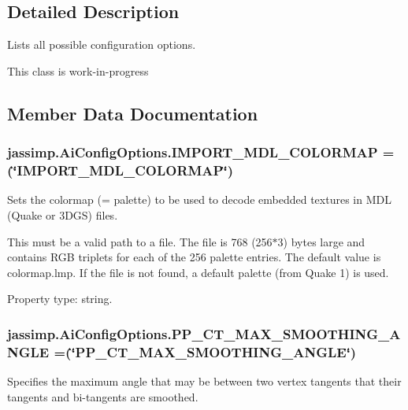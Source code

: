 \subsection{Detailed Description}
Lists all possible configuration options.

This class is work-\/in-\/progress 

\subsection{Member Data Documentation}
\hypertarget{enumjassimp_1_1_ai_config_options_a78ad0d97535fb52c830b6c853e9789c5}{
\subsubsection[{I\+M\+P\+O\+R\+T\+\_\+\+M\+D\+L\+\_\+\+C\+O\+L\+O\+R\+M\+A\+P}]{\setlength{\rightskip}{0pt plus 5cm}jassimp.\+Ai\+Config\+Options.\+I\+M\+P\+O\+R\+T\+\_\+\+M\+D\+L\+\_\+\+C\+O\+L\+O\+R\+M\+A\+P =(\char`\"{}I\+M\+P\+O\+R\+T\+\_\+\+M\+D\+L\+\_\+\+C\+O\+L\+O\+R\+M\+A\+P\char`\"{})}}\label{enumjassimp_1_1_ai_config_options_a78ad0d97535fb52c830b6c853e9789c5}
Sets the colormap (= palette) to be used to decode embedded textures in M\+D\+L (Quake or 3\+D\+G\+S) files.

This must be a valid path to a file. The file is 768 (256$\ast$3) bytes large and contains R\+G\+B triplets for each of the 256 palette entries. The default value is colormap.\+lmp. If the file is not found, a default palette (from Quake 1) is used.

Property type\+: string. \hypertarget{enumjassimp_1_1_ai_config_options_a91a508bfe571464e685c1b384386467a}{
\subsubsection[{P\+P\+\_\+\+C\+T\+\_\+\+M\+A\+X\+\_\+\+S\+M\+O\+O\+T\+H\+I\+N\+G\+\_\+\+A\+N\+G\+L\+E}]{\setlength{\rightskip}{0pt plus 5cm}jassimp.\+Ai\+Config\+Options.\+P\+P\+\_\+\+C\+T\+\_\+\+M\+A\+X\+\_\+\+S\+M\+O\+O\+T\+H\+I\+N\+G\+\_\+\+A\+N\+G\+L\+E =(\char`\"{}P\+P\+\_\+\+C\+T\+\_\+\+M\+A\+X\+\_\+\+S\+M\+O\+O\+T\+H\+I\+N\+G\+\_\+\+A\+N\+G\+L\+E\char`\"{})}}\label{enumjassimp_1_1_ai_config_options_a91a508bfe571464e685c1b384386467a}
Specifies the maximum angle that may be between two vertex tangents that their tangents and bi-\/tangents are smoothed.

